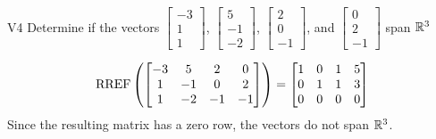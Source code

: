 \begin{problem}{V4}
Determine if the vectors  \(\begin{bmatrix} -3 \\ 1 \\ 1 \end{bmatrix}\), \(\begin{bmatrix} 5 \\ -1 \\ -2 \end{bmatrix}\), \(\begin{bmatrix}2 \\ 0 \\ -1 \end{bmatrix}\), and \(\begin{bmatrix} 0 \\ 2 \\ -1\end{bmatrix}\) span \(\mathbb{R}^3\)
\end{problem}
\begin{solution}
\[\operatorname{RREF}\left(\begin{bmatrix}
-3 & 5 & 2 & 0 \\ 1 & -1 & 0 & 2 \\ 1 & -2 & -1 & -1 \end{bmatrix}\right)=\begin{bmatrix} 1 & 0 & 1 & 5 \\ 0 & 1 & 1 & 3 \\ 0 & 0 & 0 & 0\end{bmatrix}\]
Since the resulting matrix has a zero row, the vectors do not span \(\mathbb{R}^3\).
\end{solution}


